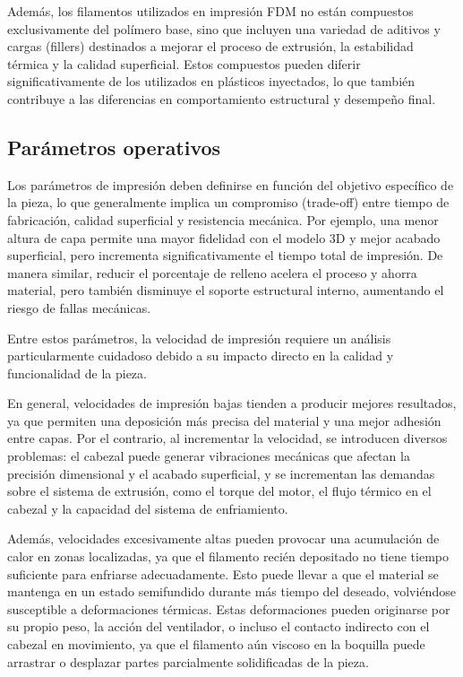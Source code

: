Además, los filamentos utilizados en impresión FDM no están compuestos exclusivamente del polímero base, sino que incluyen una variedad de aditivos y cargas (fillers) destinados a mejorar el proceso de extrusión, la estabilidad térmica y la calidad superficial. Estos compuestos pueden diferir significativamente de los utilizados en plásticos inyectados, lo que también contribuye a las diferencias en comportamiento estructural y desempeño final.

\subsection{Parámetros operativos}

Los parámetros de impresión deben definirse en función del objetivo específico de la pieza, lo que generalmente implica un compromiso (trade-off) entre tiempo de fabricación, calidad superficial y resistencia mecánica. Por ejemplo, una menor altura de capa permite una mayor fidelidad con el modelo 3D y mejor acabado superficial, pero incrementa significativamente el tiempo total de impresión. De manera similar, reducir el porcentaje de relleno acelera el proceso y ahorra material, pero también disminuye el soporte estructural interno, aumentando el riesgo de fallas mecánicas.

Entre estos parámetros, la velocidad de impresión requiere un análisis particularmente cuidadoso debido a su impacto directo en la calidad y funcionalidad de la pieza.

En general, velocidades de impresión bajas tienden a producir mejores resultados, ya que permiten una deposición más precisa del material y una mejor adhesión entre capas. Por el contrario, al incrementar la velocidad, se introducen diversos problemas: el cabezal puede generar vibraciones mecánicas que afectan la precisión dimensional y el acabado superficial, y se incrementan las demandas sobre el sistema de extrusión, como el torque del motor, el flujo térmico en el cabezal y la capacidad del sistema de enfriamiento.

Además, velocidades excesivamente altas pueden provocar una acumulación de calor en zonas localizadas, ya que el filamento recién depositado no tiene tiempo suficiente para enfriarse adecuadamente. Esto puede llevar a que el material se mantenga en un estado semifundido durante más tiempo del deseado, volviéndose susceptible a deformaciones térmicas. Estas deformaciones pueden originarse por su propio peso, la acción del ventilador, o incluso el contacto indirecto con el cabezal en movimiento, ya que el filamento aún viscoso en la boquilla puede arrastrar o desplazar partes parcialmente solidificadas de la pieza.

